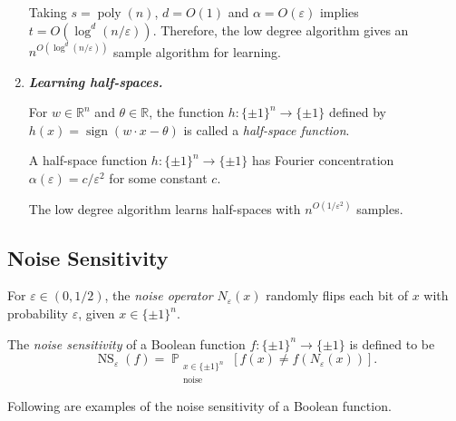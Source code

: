 \documentclass[letterpaper, reqno,11pt]{article}
\newcommand{\RR}{\mathbb{R}}
\newcommand{\PP}{\mathop{{}\mathbb{P}}}
\DeclareMathOperator{\poly}{poly}
\DeclareMathOperator{\sign}{sign}
\DeclareMathOperator{\NS}{NS}
\begin{document}
\begin{enumerate}[label=(\roman*)]
  Taking $s = \poly(n)$, $d = O(1)$ and $\alpha = O(\varepsilon)$ implies $t = O(\log^d (n/\varepsilon))$. Therefore, the low degree algorithm gives an $n^{O(\log^d (n/\varepsilon))}$ sample algorithm for learning.
  \item {\bf \em Learning half-spaces.}
  
  \begin{definition}
    For $w \in \RR^n$ and $\theta \in \RR$, the function $h : \{ \pm 1 \}^n \to \{ \pm 1 \}$ defined by $h(x) = \sign(w \cdot x - \theta)$ is called a \emph{half-space function}.
  \end{definition}

  \begin{theorem}
    A half-space function $h : \{ \pm 1 \}^n \to \{ \pm 1 \}$ has Fourier concentration $\alpha(\varepsilon) = c/\varepsilon^2$ for some constant $c$.
  \end{theorem}

  \begin{corollary}
    The low degree algorithm learns half-spaces with $n^{O(1/\varepsilon^2)}$ samples.
  \end{corollary}
\end{enumerate}

\subsection{Noise Sensitivity}

\begin{definition}
  For $\varepsilon \in (0, 1/2)$, the \emph{noise operator} $N_\varepsilon(x)$ randomly flips each bit of $x$ with probability $\varepsilon$, given $x \in \{ \pm 1 \}^n$.
\end{definition}

\begin{definition}
  The \emph{noise sensitivity} of a Boolean function $f : \{ \pm 1 \}^n \to \{ \pm 1 \}$ is defined to be
  $$ \NS_\varepsilon(f) = \PP_{\substack{x \in \{ \pm 1 \}^n \\ \text{noise}}}\left[f(x) \neq f\left(N_\varepsilon(x)\right)\right]. $$
\end{definition}

Following are examples of the noise sensitivity of a Boolean function.
\end{document}
